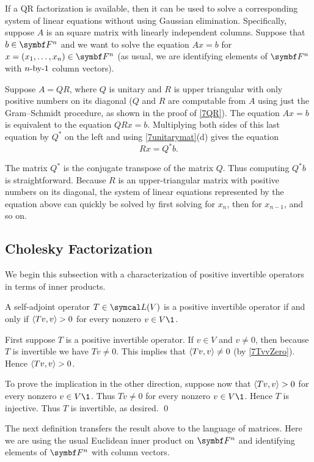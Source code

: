 If a QR factorization is available, then it can be used to solve a corresponding system of linear equations without using Gaussian elimination. Specifically, suppose $A$ is an   square matrix with linearly independent columns. Suppose that $b \in \F{n}$ and we want to solve the equation $Ax = b$ for $x = (x_1, \ldots, x_n) \in \F{n}$ (as usual, we are identifying elements of $\F{n}$ with $\mbox{$n$-by-$1$}$ column vectors).

Suppose $A = QR$, where $Q$ is unitary and $R$ is upper triangular with only positive numbers on its diagonal ($Q$ and $R$ are computable from $A$ using just the Gram--Schmidt procedure, as shown in the proof of \ref{7QR}). The equation $Ax= b$ is equivalent to the equation $QRx = b$. Multiplying both sides of this last equation by $Q^*$ on the left and using \ref{7unitarymat}(d) gives the equation
\[
Rx = Q^*b.
\]

The matrix $Q^*$ is the conjugate transpose of the matrix $Q$. Thus computing $Q^*b$ is straightforward. Because $R$ is an upper-triangular matrix with positive numbers on its diagonal, the system of linear equations represented by the equation above can quickly be solved by first solving for $x_n$, then for $x_{n-1}$, and so on.

\subsection{Cholesky Factorization}

We begin this subsection with a characterization of positive invertible operators in terms of inner products.

{A self-adjoint operator $T \in \L(V)$ is a positive invertible operator if and only if $\langle Tv, v\rangle > 0$ for every nonzero $v \in V\1$.}

\proof
First suppose $T$ is a positive invertible operator. If $v \in V$ and $v \ne 0$, then because $T$ is invertible we have $Tv \ne 0$. This implies that $\langle Tv, v\rangle \ne 0$ (by \ref{7TvvZero}). Hence $\langle Tv, v\rangle > 0$.

To prove the implication in the other direction, suppose now that $\langle Tv, v\rangle > 0$ for every nonzero $v \in V\1$. Thus $Tv \ne 0$ for every nonzero $v \in V\1$. Hence $T$ is injective. Thus $T$ is invertible, as desired.
\qed

The next definition transfers the result above to the language of matrices. Here we are using the usual Euclidean inner product on $\F n$ and identifying elements of $\F n$ with  column vectors.

